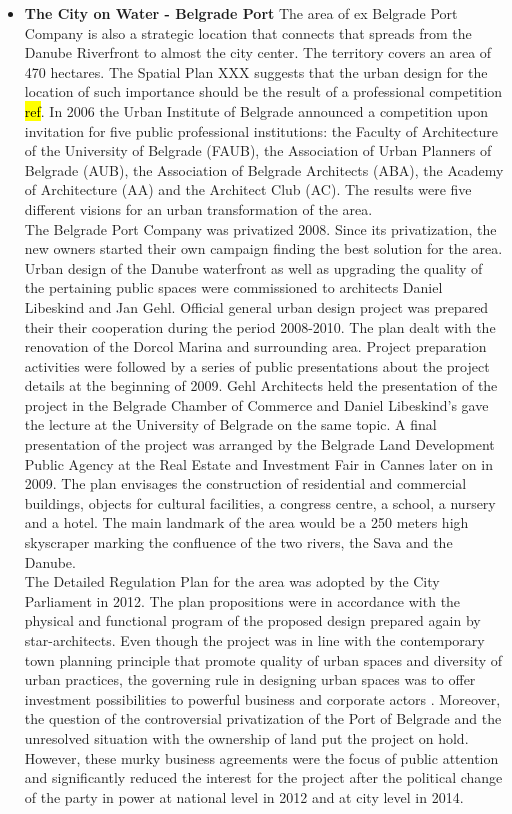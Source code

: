 \documentclass[11pt]{report}
\begin{document}
\begin{itemize}
\item \textbf{The City on Water - Belgrade Port}
The area of ex Belgrade Port Company is also a strategic location that connects that spreads from the Danube Riverfront to almost the city center. The territory covers an area of 470 hectares.
The Spatial Plan XXX suggests that the urban design for the location of such importance should be the result of a professional competition \hl{ref}.
In 2006 the Urban Institute of Belgrade announced a competition upon invitation for five public professional institutions: the  Faculty  of  Architecture  of  the  University  of  Belgrade (FAUB),  the Association  of  Urban  Planners  of  Belgrade (AUB),  the Association  of Belgrade Architects (ABA),  the  Academy  of  Architecture (AA)  and  the  Architect Club (AC). The results were five different visions for an urban transformation of the area.
\\
The  Belgrade Port Company was privatized 2008. Since its privatization,  the new owners started their own campaign finding the best solution for the area.
Urban design of the Danube waterfront as well as upgrading the quality of the pertaining public spaces were commissioned to architects Daniel Libeskind and Jan Gehl. Official general urban design  project was prepared their their cooperation during the period 2008-2010.
The plan dealt with the renovation of the Dorcol Marina and surrounding area.
Project preparation activities were followed by a series of public presentations about the project details at the beginning of 2009. Gehl Architects held the presentation of the project in the Belgrade Chamber of Commerce and Daniel Libeskind's gave the lecture at the University of Belgrade on the same topic. A final presentation of the project was arranged by the Belgrade Land Development Public Agency at the Real Estate and Investment Fair in Cannes later on in 2009. The  plan  envisages  the  construction of  residential  and  commercial  buildings,  objects for cultural facilities, a congress centre, a school, a nursery and a hotel. The main landmark of the area would be a 250 meters high skyscraper marking the confluence of the two rivers, the Sava and the Danube.
\\
The  Detailed  Regulation Plan for the area was adopted by the City  Parliament in 2012. The plan propositions  were in accordance with the physical and functional program of the proposed design prepared again by star-architects. Even though the project was in  line  with  the contemporary town planning principle that promote quality of urban spaces and diversity of urban practices, the governing rule in designing urban spaces was to offer investment possibilities to powerful business and corporate actors \cite{Vukmirovic in Doytchinov et al 2015}.
Moreover, the question of the controversial privatization of the Port of Belgrade and the unresolved situation with the ownership of land put the project on hold. However, these murky business agreements were the focus of public attention
and significantly reduced the interest for the project after the political change of the party in power at national level in 2012 and at city level in 2014. 


\end{itemize}
\end{document}
